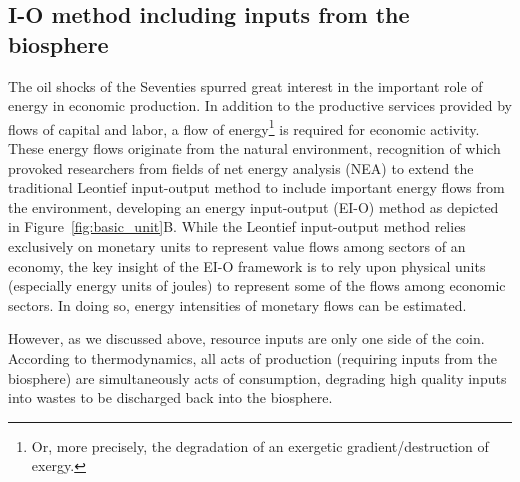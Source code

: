 \subsection{I-O method including inputs from the biosphere}
\label{sec:IO_resource}

The oil shocks of the Seventies spurred great interest in
the important role of energy in economic production.
In addition to the productive services 
provided by flows of capital and labor,
a flow of energy\footnote{Or, more precisely, 
the degradation of an exergetic gradient/destruction of exergy.} 
is required for economic activity. 
These energy flows originate from the natural environment, 
recognition of which provoked researchers from fields of 
net energy analysis (NEA) to extend 
the traditional Leontief
input-output method to include important 
energy flows from the environment, 
developing an energy input-output (EI-O)
method as depicted in Figure~\ref{fig:basic_unit}B.\cite{Carter1974,
Bullard1975,Bullard1976a,Herendeen1978,Costanza:1980ww,
Casler1984,Joshi:1999uw,Suh2009}
While the Leontief input-output method
relies exclusively 
on monetary units to represent value flows 
among sectors of an economy, 
the key insight of the EI-O framework 
is to rely upon physical units 
(especially energy units of joules) 
to represent some of the flows among economic sectors. 
In doing so, 
energy intensities of monetary flows can be estimated. 

However,
as we discussed above,
resource inputs are only one side of the coin.
According to thermodynamics,
all acts of production (requiring inputs from the biosphere)
are simultaneously acts of consumption,
degrading high quality inputs into wastes to be 
discharged back into the biosphere.


